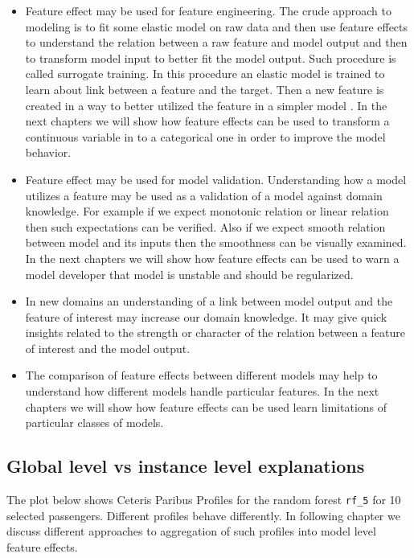 \documentclass[12pt,]{krantz}
\providecommand{\tightlist}{%
  \setlength{\itemsep}{0pt}\setlength{\parskip}{0pt}}
\theoremstyle{definition}
\theoremstyle{definition}
\theoremstyle{definition}
\theoremstyle{remark}
\begin{document}
\begin{itemize}
\tightlist
\item
  Feature effect may be used for feature engineering. The crude approach
  to modeling is to fit some elastic model on raw data and then use
  feature effects to understand the relation between a raw feature and
  model output and then to transform model input to better fit the model
  output. Such procedure is called surrogate training. In this procedure
  an elastic model is trained to learn about link between a feature and
  the target. Then a new feature is created in a way to better utilized
  the feature in a simpler model \citep{SAFE-arxiv}. In the next
  chapters we will show how feature effects can be used to transform a
  continuous variable in to a categorical one in order to improve the
  model behavior.
\item
  Feature effect may be used for model validation. Understanding how a
  model utilizes a feature may be used as a validation of a model
  against domain knowledge. For example if we expect monotonic relation
  or linear relation then such expectations can be verified. Also if we
  expect smooth relation between model and its inputs then the
  smoothness can be visually examined. In the next chapters we will show
  how feature effects can be used to warn a model developer that model
  is unstable and should be regularized.
\item
  In new domains an understanding of a link between model output and the
  feature of interest may increase our domain knowledge. It may give
  quick insights related to the strength or character of the relation
  between a feature of interest and the model output.
\item
  The comparison of feature effects between different models may help to
  understand how different models handle particular features. In the
  next chapters we will show how feature effects can be used learn
  limitations of particular classes of models.
\end{itemize}

\hypertarget{global-level-vs-instance-level-explanations}{%
\subsection{Global level vs instance level
explanations}\label{global-level-vs-instance-level-explanations}}

The plot below shows Ceteris Paribus Profiles for the random forest
\texttt{rf\_5} for 10 selected passengers. Different profiles behave
differently. In following chapter we discuss different approaches to
aggregation of such profiles into model level feature effects.
\end{document}
